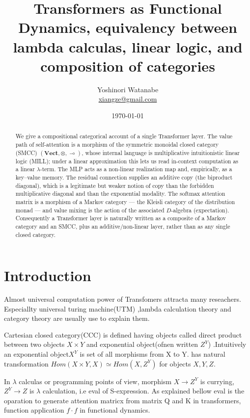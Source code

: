 \documentclass[a4paper,11pt]{article}
\begin{document}
\title{Transformers as Functional Dynamics, equivalency between lambda calculas, linear logic, and composition of categories}
\author{Yoshinori Watanabe \\ \href{mailto::xiangzey@gmail.com}{xiangze@gmail.com}}
\date{\today}
\maketitle

\begin{abstract}
We give a compositional categorical account of a single Transformer layer. 
The value path of self-attention is a morphism of the symmetric monoidal closed category (SMCC) \((\mathbf{Vect},\otimes,\multimap)\),
whose internal language is multiplicative intuitionistic linear logic (MILL); under a linear approximation this lets us read in-context
computation as a linear \(\lambda\)-term. 
The MLP acts as a non-linear realization map and, empirically, as a key--value memory. The residual connection supplies an additive copy (the biproduct diagonal), which is a legitimate but weaker notion of copy than the forbidden multiplicative diagonal and than the exponential modality. The softmax attention matrix is a morphism of a Markov category --- the Kleisli category of the distribution monad --- and value mixing is the action of the associated \(D\)-algebra (expectation). 
Consequently a Transformer layer is naturally written as a composite of a Markov category and an SMCC, plus an additive/non-linear layer, rather than as any single closed category.
\end{abstract} 

\hypertarget{introduction}{%
\section{Introduction}\label{introduction}}

Almost universal computation power of Transfomers attracta many reseachers. Especiallty universal turing machine(UTM) ,lambda calculation theory and category theory are usually use to explain them.

Cartesian closed category(CCC) is defined having objects called direct product between two objects \(X\times Y\) and exponential object(ofnen
written \(Z^Y\)) .Intuitively an exponential object\(X^Y\) is set of all
morphisms from X to Y. has natural transformation \(Hom(X\times Y,X)\simeq Hom(X,Z^Y)\) for objects \(X,Y,Z\).

In \(\lambda\) calculas or programming points of view, morphism \(X \rightarrow Z^Y\) is currying, \(Z^Y \rightarrow Z\) is \(\lambda\) calculation, i.e eval of S-expression. As explained bellow eval is the oparation to generate attention matricx from matrix Q and K in transformers, function
application \(f\cdot f\) in functional dynamics.
\end{document}
